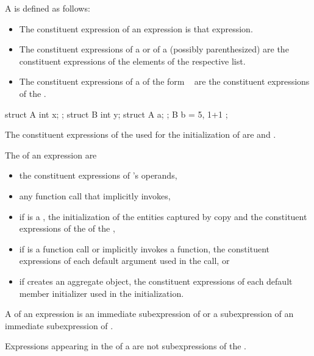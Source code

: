 \pnum
A  is defined as follows:
\begin{itemize}
\item
The constituent expression of an expression is that expression.
\item
The constituent expressions of a  or
of a (possibly parenthesized) 
are the constituent expressions of the elements of the respective list.
\item
The constituent expressions of a 
of the form \tcode{=}~
are the constituent expressions of the .
\end{itemize}
\begin{example}
\begin{codeblock}
struct A { int x; };
struct B { int y; struct A a; };
B b = { 5, { 1+1 } };
\end{codeblock}
The constituent expressions of the 
used for the initialization of  are  and .
\end{example}

\pnum
The  of an expression  are
\begin{itemize}
\item
the constituent expressions of 's operands,
\item
any function call that  implicitly invokes,
\item
if  is a ,
the initialization of the entities captured by copy and
the constituent expressions of the  of the ,
\item
if  is a function call or implicitly invokes a function,
the constituent expressions of each default argument
used in the call, or
\item
if  creates an aggregate object,
the constituent expressions of each default member initializer
used in the initialization.
\end{itemize}

\pnum
A  of an expression  is
an immediate subexpression of  or
a subexpression of an immediate subexpression of .
\begin{note}
Expressions appearing in the  of a 
are not subexpressions of the .
\end{note}

